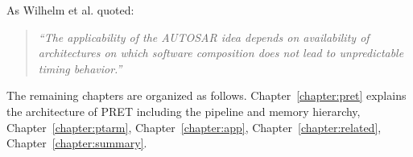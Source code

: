 As Wilhelm et al. \cite{Wilhelm_future_arch_09} quoted:
\begin{quote} \textit{
  ``The applicability of the AUTOSAR idea depends on availability of
  architectures on which software composition does not lead to
  unpredictable timing behavior.''
}
\end{quote}


The remaining chapters are organized as follows. 
Chapter~\ref{chapter:pret} explains the architecture of PRET including the \thdint pipeline and memory hierarchy, Chapter~\ref{chapter:ptarm}, Chapter~\ref{chapter:app}, Chapter~\ref{chapter:related}, Chapter~\ref{chapter:summary}.


